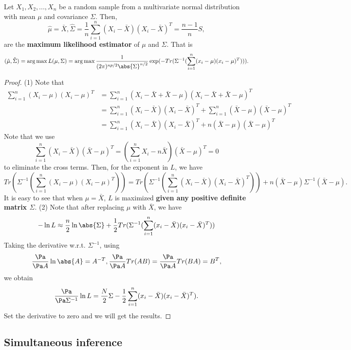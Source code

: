 \begin{refsection}
\begin{lemma}\cite[172]{johnson2007applied}
Let $X_1,X_2,...,X_n$ be a random sample from a multivariate normal distribution with mean $\mu$ and covariance $\Sigma$. Then, 
$$\hat{\mu} = \bar{X}, \hat{\Sigma} = \frac{1}{n}\sum_{i=1}^n (X_i - \bar{X})(X_i - \bar{X})^T = \frac{n-1}{n}S,$$
are the \textbf{maximum likelihood estimator} of $\mu$ and $\Sigma$. That is
$$(\hat{\mu},\hat{\Sigma}) = \arg\max L(\mu,\Sigma) = \arg\max \frac{1}{(2\pi)^{np/2}\abs{\Sigma}^{n/2}}\exp(-Tr(\Sigma^{-1}(\sum_{i=1}^n (x_i - \mu)(x_i-\mu)^T))). $$ 
\end{lemma}
\begin{proof}
(1) Note that
\begin{align*}
\sum_{i=1}^n (X_i - \mu)(X_i - \mu)^T &=\sum_{i=1}^n (X_i - \bar{X} + \bar{X} - \mu)(X_i - \bar{X} + \bar{X} - \mu)^T\\
&=\sum_{i=1}^n (X_i - \bar{X})(X_i - \bar{X})^T + \sum_{i=1}^n (\bar{X} - \mu)(\bar{X} - \mu)^T \\
&=\sum_{i=1}^n (X_i - \bar{X})(X_i - \bar{X})^T + n (\bar{X} - \mu)(\bar{X} - \mu)^T 
\end{align*}
Note that we use $$\sum_{i=1}^n (X_i - \bar{X})(\bar{X} - \mu)^T =  (\sum_{i=1}^n X_i - n\bar{X})(\bar{X} - \mu)^T = 0$$
to eliminate the cross terms.
Then, for the exponent in $L$, we have
$$Tr(\Sigma^{-1}(\sum_{i=1}^n (X_i - \mu)(X_i-\mu)^T)) = Tr(\Sigma^{-1}(\sum_{i=1}^n (X_i - \bar{X})(X_i-\bar{X})^T))+ n (\bar{X} - \mu)\Sigma^{-1}(\bar{X} - \mu).$$
It is easy to see that when $\mu = \bar{X}$, $L$ is maximized \textbf{given any positive definite matrix $\Sigma$}.
(2) Note that after replacing $\mu$ with $\bar{X}$, we have
$$
- \ln L \approx \frac{n}{2}\ln \abs{\Sigma} + \frac{1}{2} Tr(\Sigma^{-1}(\sum_{i=1}^n (x_i - \bar{X})(x_i-\bar{X})^T)) 
$$
Taking the derivative w.r.t. $\Sigma^{-1}$, using
$$\frac{\Pa}{\Pa A} \ln \abs{A} = A^{-T}, \frac{\Pa}{\Pa A}Tr(AB) = \frac{\Pa}{\Pa A}Tr(BA) = B^T, $$
we obtain
$$\frac{\Pa}{\Pa \Sigma^{-1}} \ln L = \frac{N}{2}\Sigma - \frac{1}{2}\sum_{i=1}^n (x_i - \bar{X})(x_i-\bar{X})^T).$$
Set the derivative to zero and we will get the results. 
\end{proof}


\subsection{Simultaneous inference }



\end{refsection}
